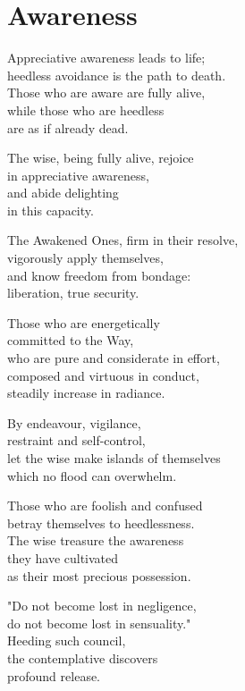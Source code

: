 
\chapter{Awareness}

Appreciative awareness leads to life;\\
heedless avoidance is the path to death.\\
Those who are aware are fully alive,\\
while those who are heedless\\
are as if already dead.

The wise, being fully alive, rejoice\\
in appreciative awareness,\\
and abide delighting\\
in this capacity.


The Awakened Ones, firm in their resolve,\\
vigorously apply themselves,\\
and know freedom from bondage:\\
liberation, true security.


Those who are energetically\\
committed to the Way,\\
who are pure and considerate in effort,\\
composed and virtuous in conduct,\\
steadily increase in radiance.


By endeavour, vigilance,\\
restraint and self-control,\\
let the wise make islands of themselves\\
which no flood can overwhelm.



Those who are foolish and confused\\
betray themselves to heedlessness.\\
The wise treasure the awareness\\
they have cultivated\\
as their most precious possession.


"Do not become lost in negligence,\\
do not become lost in sensuality."\\
Heeding such council,\\
the contemplative discovers\\
profound release.

